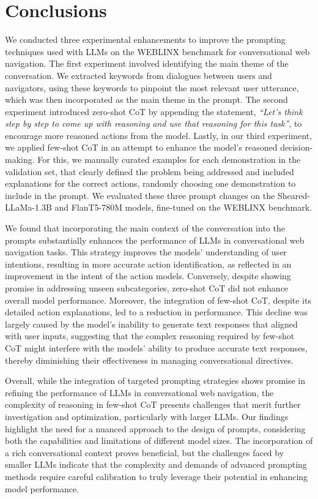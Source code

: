 \documentclass[11pt]{article}
\begin{document}
\section{Conclusions}
We conducted three experimental enhancements to improve the prompting techniques used with LLMs on the WEBLINX benchmark for conversational web navigation. The first experiment involved identifying the main theme of the conversation. We extracted keywords from dialogues between users and navigators, using these keywords to pinpoint the most relevant user utterance, which was then incorporated as the main theme in the prompt. The second experiment introduced zero-shot CoT by appending the statement, \emph{“Let's think step by step to come up with reasoning and use that reasoning for this task”}, to encourage more reasoned actions from the model. Lastly, in our third experiment, we applied few-shot CoT in an attempt to enhance the model's reasoned decision-making. For this, we manually curated examples for each demonstration in the validation set, that clearly defined the problem being addressed and included explanations for the correct actions, randomly choosing one demonstration to include in the prompt. We evaluated these three prompt changes on the Sheared-LLaMa-1.3B and FlanT5-780M models, fine-tuned on the WEBLINX benchmark.

We found that incorporating the main context of the conversation into the prompts substantially enhances the performance of LLMs in conversational web navigation tasks. This strategy improves the models' understanding of user intentions, resulting in more accurate action identification, as reflected in an improvement in the intent of the action models. Conversely, despite showing promise in addressing unseen subcategories, zero-shot CoT did not enhance overall model performance. Moreover, the integration of few-shot CoT, despite its detailed action explanations, led to a reduction in performance. This decline was largely caused by the model's inability to generate text responses that aligned with user inputs, suggesting that the complex reasoning required by few-shot CoT might interfere with the models' ability to produce accurate text responses, thereby diminishing their effectiveness in managing conversational directives.

Overall, while the integration of targeted prompting strategies shows promise in refining the performance of LLMs in conversational web navigation, the complexity of reasoning in few-shot CoT presents challenges that merit further investigation and optimization, particularly with larger LLMs. Our findings highlight the need for a nuanced approach to the design of prompts, considering both the capabilities and limitations of different model sizes. The incorporation of a rich conversational context proves beneficial, but the challenges faced by smaller LLMs indicate that the complexity and demands of advanced prompting methods require careful calibration to truly leverage their potential in enhancing model performance.
\end{document}
